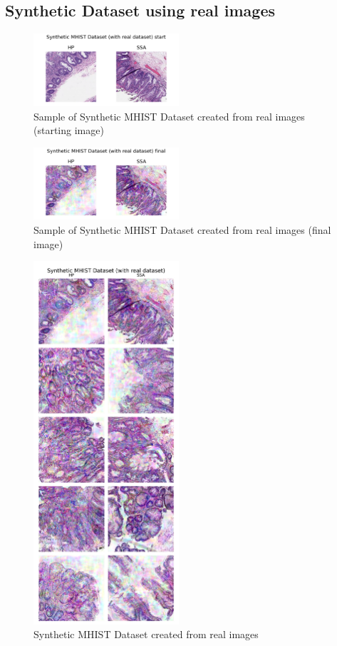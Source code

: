 \documentclass[conference, compsoc]{IEEEtran}
\begin{document}
\subsection{Synthetic Dataset using real images}
\begin{figure}[H]
	\centering
	\includegraphics[width=0.48\textwidth]{mhist_real_sample.png}
	\caption{Sample of Synthetic MHIST Dataset created from real images (starting image)}
	\label{fig:mhist_real_sample}
\end{figure}
\begin{figure}[H]
	\centering
	\includegraphics[width=0.48\textwidth]{mhist_real_syn.png}
	\caption{Sample of Synthetic MHIST Dataset created from real images (final image)}
	\label{fig:mhist_real_final}
\end{figure}


\begin{figure}[H]
	\centering
	\includegraphics[width=0.48\textwidth]{mhist_real_syn_all.png}
	\caption{Synthetic MHIST Dataset created from real images}
	\label{fig:mhist_real_syn_all}
\end{figure}
\end{document}
